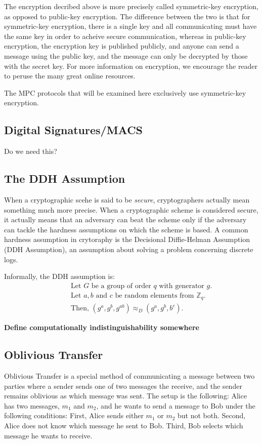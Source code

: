 \documentclass[12pt,twoside]{reedthesis}
\newcommand{\compIndist}{\approx_D}
\begin{document}
The encryption decribed above is more precisely called symmetric-key encryption, as opposed to public-key encryption.
The difference between the two is that for symmetric-key encryption, there is a single key and all communicating must have the same key in order to acheive secure communication, whereas in public-key encryption, the encryption key is published publicly, and anyone can send a message using the public key, and the message can only be decrypted by those with the secret key.
For more information on encryption, we encourage the reader to peruse the many great online resources.

The MPC protocols that will be examined here exclusively use symmetric-key encryption.

\subsection{Digital Signatures/MACS}
Do we need this?

\subsection{The DDH Assumption} \label{sctn:DDH}
When a cryptographic scehe is said to be \textit{secure}, cryptographers actually mean something much more precise. 
When a cryptographic scheme is considered secure, it actually means that an adversary can beat the scheme only if the adversary can tackle the hardness assumptions on which the scheme is based.
A common hardness assumption in crytoraphy is the Decisional Diffie-Helman Assumption (DDH Assumption), an assumption about solving a problem concerning discrete logs.

Informally, the DDH assumption is:
\begin{equation}
	\label{eqn:DDH}
	\begin{split}
	& \qquad \text{Let $G$ be a group of order $q$ with generator $g$.} \\
	& \qquad \text{Let $a, b$ and $c$ be random elements from $\mathbb{Z}_q$.} \\
	& \qquad \text{Then, $(g^a, g^b, g^{ab}) \compIndist (g^a, g^b, b^c)$}. 
	\end{split}
\end{equation}

\textbf{Define computationally indistinguishability somewhere}

\subsection{Oblivious Transfer}
Oblivious Transfer is a special method of communicating a message between two parties where a sender sends one of two messages the receive, and the sender remains oblivious as which message was sent.
The setup is the following:
Alice has two messages, $m_1$ and $m_2$, and he wants to send a message to Bob under the following conditions: First, Alice sends either $m_1$ or $m_2$ but not both. Second, Alice does not know which message he sent to Bob. Third, Bob selects which message he wants to receive.
\end{document}
